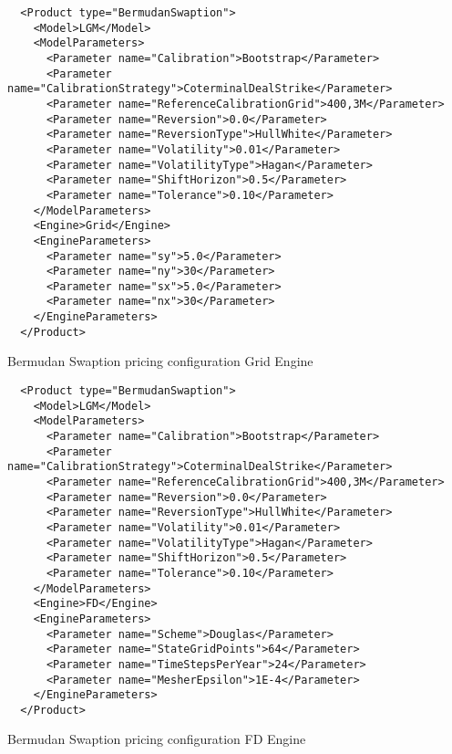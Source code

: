 \begin{listing}[h]
\begin{verbatim}
  <Product type="BermudanSwaption">
    <Model>LGM</Model>
    <ModelParameters>
      <Parameter name="Calibration">Bootstrap</Parameter>
      <Parameter name="CalibrationStrategy">CoterminalDealStrike</Parameter>
      <Parameter name="ReferenceCalibrationGrid">400,3M</Parameter>
      <Parameter name="Reversion">0.0</Parameter>
      <Parameter name="ReversionType">HullWhite</Parameter>
      <Parameter name="Volatility">0.01</Parameter>
      <Parameter name="VolatilityType">Hagan</Parameter>
      <Parameter name="ShiftHorizon">0.5</Parameter>
      <Parameter name="Tolerance">0.10</Parameter>
    </ModelParameters>
    <Engine>Grid</Engine>
    <EngineParameters>
      <Parameter name="sy">5.0</Parameter>
      <Parameter name="ny">30</Parameter>
      <Parameter name="sx">5.0</Parameter>
      <Parameter name="nx">30</Parameter>
    </EngineParameters>
  </Product>
\end{verbatim}
\caption{Bermudan Swaption pricing configuration Grid Engine}
\label{lst:ir_bermswaption_pricing_config}
\end{listing}

\begin{listing}[h]
\begin{verbatim}
  <Product type="BermudanSwaption">
    <Model>LGM</Model>
    <ModelParameters>
      <Parameter name="Calibration">Bootstrap</Parameter>
      <Parameter name="CalibrationStrategy">CoterminalDealStrike</Parameter>
      <Parameter name="ReferenceCalibrationGrid">400,3M</Parameter>
      <Parameter name="Reversion">0.0</Parameter>
      <Parameter name="ReversionType">HullWhite</Parameter>
      <Parameter name="Volatility">0.01</Parameter>
      <Parameter name="VolatilityType">Hagan</Parameter>
      <Parameter name="ShiftHorizon">0.5</Parameter>
      <Parameter name="Tolerance">0.10</Parameter>
    </ModelParameters>
    <Engine>FD</Engine>
    <EngineParameters>
      <Parameter name="Scheme">Douglas</Parameter>
      <Parameter name="StateGridPoints">64</Parameter>
      <Parameter name="TimeStepsPerYear">24</Parameter>
      <Parameter name="MesherEpsilon">1E-4</Parameter>
    </EngineParameters>
  </Product>
\end{verbatim}
\caption{Bermudan Swaption pricing configuration FD Engine}
\label{lst:ir_bermswaption_pricing_config_fd}
\end{listing}

